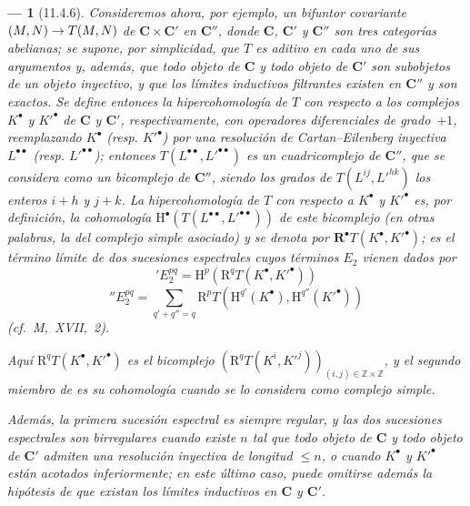 \documentclass[10pt,oneside,openany]{book}
\theoremstyle{egaenv}\newtheorem*{env}{---}
\theoremstyle{egastatement}
\theoremstyle{egadescription}
\newcommand{\oldpage}[2][]{\marginnote{\normalfont\scriptsize\textbf{#1}\,|\,#2}\ignorespaces}
\renewcommand{\leq}{\leqslant}
\renewcommand{\to}{\mathchoice{\longrightarrow}{\rightarrow}{\rightarrow}{\rightarrow}}
\begin{document}
\begin{env}[11.4.6]
\label{0.11.4.6}
\label{0.11.4.6-fr}
Consideremos ahora, por ejemplo, un \emph{bifuntor} covariante $(M,N)\to T(M,N)$ de $\boldsymbol{C}\times\boldsymbol{C}'$ en $\boldsymbol{C}''$, donde $\boldsymbol{C}$, $\boldsymbol{C}'$ y $\boldsymbol{C}''$ son tres categorías abelianas;
se supone, por simplicidad, que $T$ es aditivo en cada uno de sus argumentos y, además, que todo objeto de $\boldsymbol{C}$ y todo objeto de $\boldsymbol{C}'$ son subobjetos de un objeto inyectivo,
y que los límites inductivos filtrantes existen en $\boldsymbol{C}''$ y son exactos.
Se define entonces la \emph{hipercohomología} de $T$ con respecto a los complejos $K^\bullet$ y $K'^\bullet$ de $\boldsymbol{C}$ y $\boldsymbol{C}'$, respectivamente, con operadores diferenciales de grado~$+1$, reemplazando $K^\bullet$ (resp. $K'^\bullet$) por una resolución de Cartan--Eilenberg inyectiva $L^{\bullet\bullet}$ (resp. $L'^{\bullet\bullet}$);
entonces $T(L^{\bullet\bullet},L'^{\bullet\bullet})$ es un cuadricomplejo de $\boldsymbol{C}''$, que se considera como un \emph{bicomplejo} de $\boldsymbol{C}''$, siendo los grados de $T(L^{ij},L'^{hk})$ los enteros $i+h$ y $j+k$.
La \emph{hipercohomología} de $T$ con respecto a $K^\bullet$ y $K'^\bullet$ es, por definición, la cohomología $\mathrm H^\bullet(T(L^{\bullet\bullet},L'^{\bullet\bullet}))$ de este bicomplejo (en otras palabras, la del complejo simple asociado) y se denota por $\mathbf R^\bullet T(K^\bullet,K'^\bullet)$;
\oldpage[0\textsubscript{III}]{35}
es el término límite de dos sucesiones espectrales cuyos términos $E_2$ vienen dados por
\[
  \label{0.11.4.6.1-fr}
  'E_2^{pq}=\mathrm H^p(\mathrm R^qT(K^\bullet,K'^\bullet))
  \tag{11.4.6.1}
\]
\[
  \label{0.11.4.6.2-fr}
  ''E_2^{pq}=\sum_{q'+q''=q}
  \mathrm R^pT(\mathrm H^{q'}(K^\bullet),\mathrm H^{q''}(K'^\bullet))
  \tag{11.4.6.2}
\]
(cf.~M,~XVII,~2).

Aquí $\mathrm R^qT(K^\bullet,K'^\bullet)$ es el bicomplejo $(\mathrm R^qT(K^i,K'^j))_{(i,j)\in\mathbb Z\times\mathbb Z}$, y el segundo miembro de  es su cohomología cuando se lo considera como complejo simple.

Además, la primera sucesión espectral es siempre regular, y las dos sucesiones espectrales son birregulares cuando existe $n$ tal que todo objeto de $\boldsymbol{C}$ y todo objeto de $\boldsymbol{C}'$ admiten una resolución inyectiva de longitud $\leq n$, o cuando $K^\bullet$ \emph{y} $K'^\bullet$ están acotados inferiormente;
en este último caso, puede omitirse además la hipótesis de que existan los límites inductivos en $\boldsymbol{C}$ y $\boldsymbol{C}'$.


\end{env}
\end{document}
